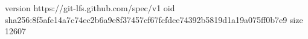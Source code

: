 version https://git-lfs.github.com/spec/v1
oid sha256:8f5afe14a7c74ec2b6a9e8f37457cf67fcfdce74392b5819d1a19a075ff0b7e9
size 12607
